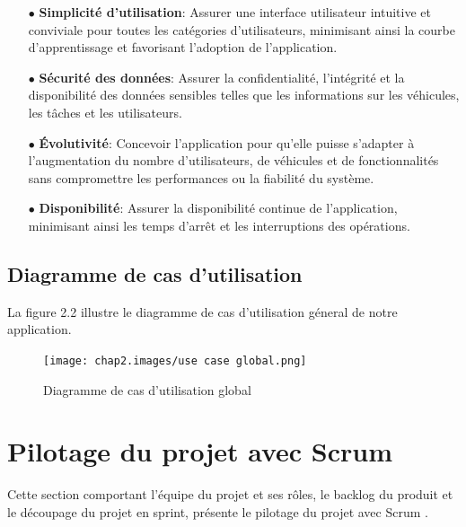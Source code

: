 \begin{itemize}
  \item[$\bullet$] \textbf {Simplicité d'utilisation}:  Assurer une interface utilisateur intuitive et conviviale pour toutes les catégories d'utilisateurs, minimisant ainsi la courbe d'apprentissage et favorisant l'adoption de l'application.\\

  \item[$\bullet$] \textbf {Sécurité des données}: Assurer la confidentialité, l'intégrité et la disponibilité des données sensibles telles que les informations sur les véhicules, les tâches et les utilisateurs.\\

  \item[$\bullet$] \textbf {Évolutivité}: Concevoir l'application pour qu'elle puisse s'adapter à l'augmentation du nombre d'utilisateurs, de véhicules et de fonctionnalités sans compromettre les performances ou la fiabilité du système.\\

  \item[$\bullet$] \textbf {Disponibilité}:  Assurer la disponibilité continue de l'application, minimisant ainsi les temps d'arrêt et les interruptions des opérations.


\end{itemize}




\newpage
\subsection{Diagramme de cas d'utilisation}
La figure 2.2 illustre le diagramme de cas d'utilisation géneral de notre application.
\bigskip
\begin{figure}[H]
  \centering
  \texttt{[image: chap2.images/use case global.png]}
  \caption{Diagramme de cas d'utilisation global}
\end{figure}






\newpage
\section{Pilotage du projet avec Scrum}
Cette section comportant l’équipe du projet et ses rôles, le backlog du produit et le découpage du projet en sprint, présente le pilotage du projet avec Scrum .
